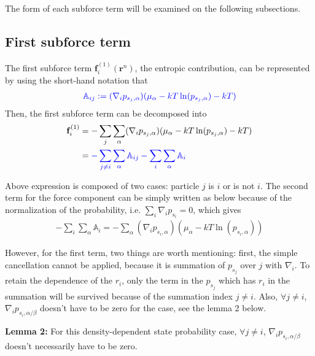 \documentclass[11pt, oneside]{article}   	%
\begin{document}
The form of each subforce term will be examined on the following subsections.

\subsection{First subforce term}
The first subforce term $\mathbf{f}^{(1)}_i (\mathbf{r}^n)$, the entropic contribution, can be represented by using the short-hand notation that
\begin{align*}
\color{blue} \mathbb{A}_{ij} := (\nabla_i p_{s_j, \alpha}) (\mu_{\alpha} - kT \ln(p_{s_j, \alpha}) - kT) 
\end{align*}
Then, the first subforce term can be decomposed into 
\begin{align}
\mathbf{f}^{(1)}_i &= - \sum_{j} \sum_{\alpha} (\nabla_i p_{s_j, \alpha}) (\mu_{\alpha} - kT \ln(p_{s_j, \alpha}) - kT)  \\ \notag
&= \color{blue} - \sum_{j\neq i} \sum_{\alpha}  \mathbb{A}_{ij}  - \sum_{i} \sum_{\alpha} \mathbb{A}_{i}   
\end{align}

Above expression is composed of two cases: particle $j$ is $i$ or is not $i$. The second term for the force component can be simply written as below because of the normalization of the probability, i.e. $\sum_i \nabla_i p_{s_i} = 0$, which gives
\begin{align}
 - \sum_{i} \sum_{\alpha} \mathbb{A}_{i}    = - \sum_{\alpha} (\nabla_i p_{s_i, \alpha}) (\mu_{\alpha} - kT \ln(p_{s_i, \alpha}))
\end{align}

However, for the first term, two things are worth mentioning: first, the simple cancellation cannot be applied, because it is summation of $p_{s_j}$ over $j$ with $\nabla_i$. To retain the dependence of the $r_i$, only the term in the $p_{s_j}$ which has $r_i$ in the summation will be survived because of the summation index $j\neq i$. Also, $\forall j \neq i$, $\nabla_i p_{s_i, \alpha/\beta}$ doesn't have to be zero for the case, see the lemma 2 below. 

\textbf{Lemma 2:} For this density-dependent state probability case, $\forall j \neq i$, $\nabla_i p_{s_i, \alpha/\beta}$ doesn't necessarily have to be zero. 
\end{document}
